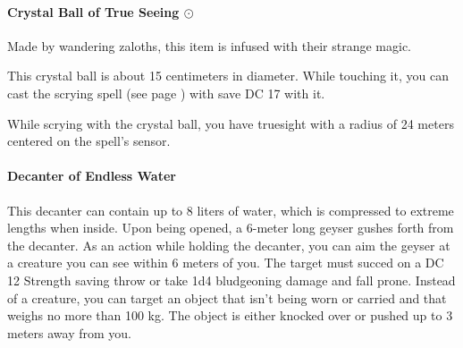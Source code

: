     \paragraph{Crystal Ball of True Seeing $\odot$}
        Made by wandering zaloths, this item is infused with their strange magic.

        This crystal ball is about 15 centimeters in diameter.
        While touching it, you can cast the scrying spell (see page \pageref{spell::scrying}) with save DC 17 with it.

        While scrying with the crystal ball, you have truesight with a radius of 24 meters centered on the spell's sensor.
    \paragraph{Decanter of Endless Water}
        This decanter can contain up to 8 liters of water, which is compressed to extreme lengths when inside.
        Upon being opened, a 6-meter long geyser gushes forth from the decanter.
        As an action while holding the decanter, you can aim the geyser at a creature you can see within 6 meters of you.
        The target must succed on a DC 12 Strength saving throw or take 1d4 bludgeoning damage and fall prone.
        Instead of a creature, you can target an object that isn't being worn or carried and that weighs no more than 100 kg.
        The object is either knocked over or pushed up to 3 meters away from you.

